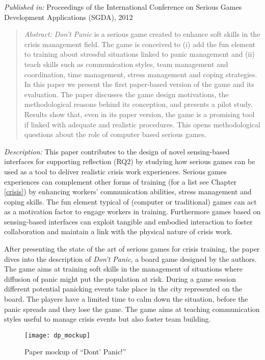 \emph{Published in:} Proceedings of the International Conference on Serious Games Development Applications (SGDA), 2012 

\begin{quote}
	\emph{Abstract:} \emph{Don't Panic} is a serious game created to enhance soft skills in the crisis management field. The game is conceived to (i) add the fun element to training about stressful situations linked to panic management and (ii) teach skills such as communication styles, team management and coordination, time management, stress management and coping strategies. In this paper we present the first paper-based version of the game and its evaluation. The paper discusses the game design motivations, the methodological reasons behind its conception, and presents a pilot study. Results show that, even in its paper version, the game is a promising tool if linked with adequate and realistic procedures. This opens methodological questions about the role of computer based serious games. 
\end{quote}

\emph{Description:} This paper contributes to the design of novel sensing-based interfaces for supporting reflection (RQ2) by studying how serious games can be used as a tool to deliver realistic crisis work experiences. Serious games experiences can complement other forms of training (for a list see Chapter \ref{crisis}) by enhancing workers' communication abilities, stress management and coping skills. The fun element typical of (computer or traditional) games can act as a motivation factor to engage workers in training. Furthermore games based on sensing-based interfaces can exploit tangible and embodied interaction to foster collaboration and maintain a link with the physical nature of crisis work.

After presenting the state of the art of serious games for crisis training, the paper dives into the description of \emph{Don't Panic}, a board game designed by the authors. The game aims at training soft skills in the management of situations where diffusion of panic might put the population at risk. During a game session different potential panicking events take place in the city represented on the board. The players have a limited time to calm down the situation, before the panic spreads and they lose the game. The game aims at teaching communication styles useful to manage crisis events but also foster team building. 

\begin{figure}
	[tbh] \centering 
	\texttt{[image: dp\_mockup]} \caption{Paper mockup of “Dont’ Panic!”} \label{fig:dp-mockup} 
\end{figure}

